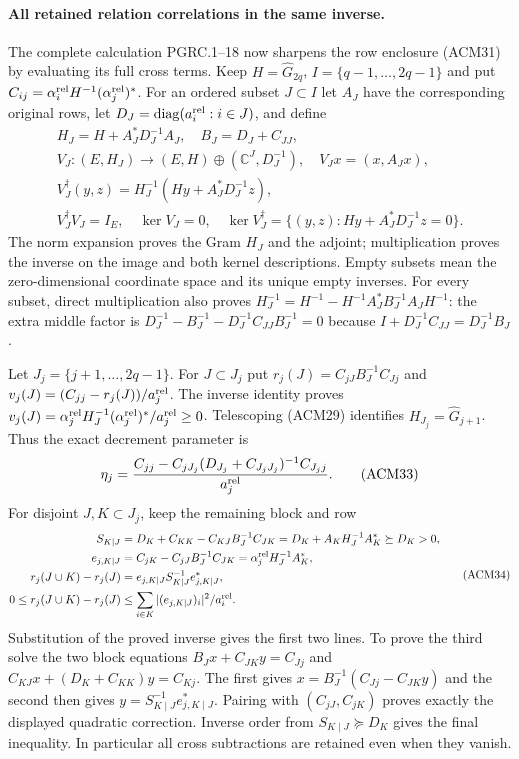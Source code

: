 \paragraph{All retained relation correlations in the same inverse.}
The complete calculation PGRC.1--18 now sharpens the row enclosure
(ACM31) by evaluating its full cross terms. Keep
$H=\widehat G_{2q}$, $I=\{q-1,\ldots,2q-1\}$ and put
$C_{ij}=\alpha_i^{\rm rel}H^{-1}(\alpha_j^{\rm rel})^*$.
For an ordered subset $J\subset I$ let $A_J$ have the corresponding
original rows, let $D_J=\operatorname{diag}(a_i^{\rm rel}:i\in J)$,
and define
\[
\begin{gathered}
 H_J=H+A_J^*D_J^{-1}A_J,\quad B_J=D_J+C_{JJ},\\
 V_J:(E,H_J)\longrightarrow(E,H)\oplus(\mathbb{C}^J,D_J^{-1}),
 \quad V_Jx=(x,A_Jx),\\
 V_J^\dagger(y,z)=H_J^{-1}(Hy+A_J^*D_J^{-1}z),\\
 V_J^\dagger V_J=I_E,\quad\ker V_J=0,\quad
 \ker V_J^\dagger=\{(y,z):Hy+A_J^*D_J^{-1}z=0\}.
\end{gathered}\tag{ACM32}
\]
The norm expansion proves the Gram $H_J$ and the adjoint;
multiplication proves the inverse on the image and both kernel
descriptions. Empty subsets mean the zero-dimensional coordinate
space and its unique empty inverses. For every subset, direct
multiplication also proves
$H_J^{-1}=H^{-1}-H^{-1}A_J^*B_J^{-1}A_JH^{-1}$:
the extra middle factor is
$D_J^{-1}-B_J^{-1}-D_J^{-1}C_{JJ}B_J^{-1}=0$
because $I+D_J^{-1}C_{JJ}=D_J^{-1}B_J$.

Let $J_j=\{j+1,\ldots,2q-1\}$. For $J\subset J_j$ put
$r_j(J)=C_{jJ}B_J^{-1}C_{Jj}$ and
$v_j(J)=(C_{jj}-r_j(J))/a_j^{\rm rel}$.
The inverse identity proves
$v_j(J)=\alpha_j^{\rm rel}H_J^{-1}(\alpha_j^{\rm rel})^*/a_j^{\rm rel}
\geq0$. Telescoping (ACM29) identifies
$H_{J_j}=\widehat G_{j+1}$. Thus the exact decrement parameter is
\[
 \eta_j=
 \frac{C_{jj}-C_{jJ_j}(D_{J_j}+C_{J_jJ_j})^{-1}C_{J_jj}}
      {a_j^{\rm rel}}.
 \tag{ACM33}
\]
For disjoint $J,K\subset J_j$, keep the remaining block and row
\[
\begin{aligned}
 S_{K\mid J}&=D_K+C_{KK}-C_{KJ}B_J^{-1}C_{JK}
             =D_K+A_KH_J^{-1}A_K^*\succeq D_K>0,\\
 e_{j,K\mid J}&=C_{jK}-C_{jJ}B_J^{-1}C_{JK}
                =\alpha_j^{\rm rel}H_J^{-1}A_K^*,\\
 r_j(J\cup K)-r_j(J)&=e_{j,K\mid J}S_{K\mid J}^{-1}e_{j,K\mid J}^*,\\
 0\leq r_j(J\cup K)-r_j(J)
 &\leq\sum_{i\in K}|(e_{j,K\mid J})_i|^2/a_i^{\rm rel}.
\end{aligned}\tag{ACM34}
\]
Substitution of the proved inverse gives the first two lines.
To prove the third solve the two block equations
$B_Jx+C_{JK}y=C_{Jj}$ and
$C_{KJ}x+(D_K+C_{KK})y=C_{Kj}$.
The first gives $x=B_J^{-1}(C_{Jj}-C_{JK}y)$ and the second
then gives $y=S_{K\mid J}^{-1}e_{j,K\mid J}^*$.
Pairing with $(C_{jJ},C_{jK})$ proves exactly the displayed
quadratic correction. Inverse order from $S_{K\mid J}\succeq D_K$
gives the final inequality. In particular all cross subtractions
are retained even when they vanish.

